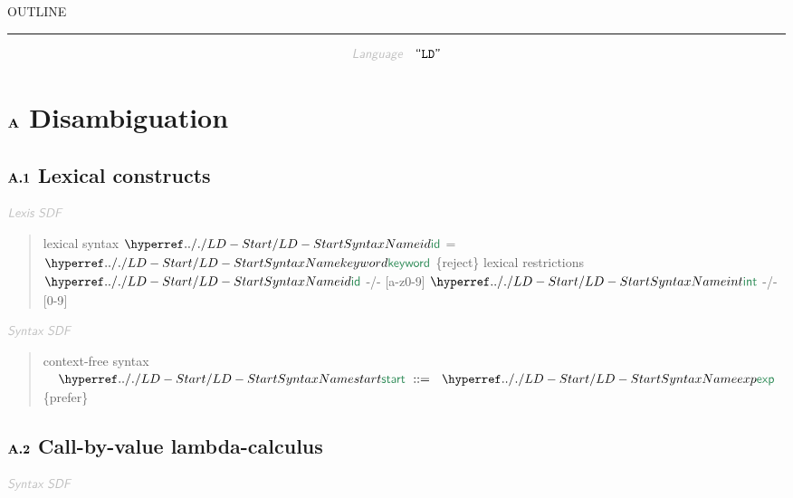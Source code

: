 


    OUTLINE
  \tableofcontents
\begin{center}
\rule{3in}{0.4pt}
\end{center}

\begin{displaymath}
\KEY{Language} \quad \STRING{LD}
\end{displaymath}

\section{$\SECT{A}$ Disambiguation}\hypertarget{SectionNumber:A}{}\label{SectionNumber:A}

\subsection{$\SECT{A.1}$ Lexical constructs}\hypertarget{SectionNumber:A.1}{}\label{SectionNumber:A.1}

$\KEY{Lexis SDF}$

\begin{quote}
lexical syntax\newline
     $\SHADE{\SYNHYPER{../.}{LD-Start}{id}}$ = $\SHADE{\SYNHYPER{../.}{LD-Start}{keyword}}$ \{reject\}\newline
   \newline
   lexical restrictions\newline
     $\SHADE{\SYNHYPER{../.}{LD-Start}{id}}$  -/- {[}a-z0-9{]}\newline
     $\SHADE{\SYNHYPER{../.}{LD-Start}{int}}$ -/- {[}0-9{]}
\end{quote}

$\KEY{Syntax SDF}$

\begin{quote}
context-free syntax\newline
   $\SHADE{\quad\SYNHYPER{../.}{LD-Start}{start}  \ ::= \  \  \SYNHYPER{../.}{LD-Start}{exp}}$ \{prefer\}
\end{quote}

\subsection{$\SECT{A.2}$ Call-by-value lambda-calculus}\hypertarget{SectionNumber:A.2}{}\label{SectionNumber:A.2}

$\KEY{Syntax SDF}$

